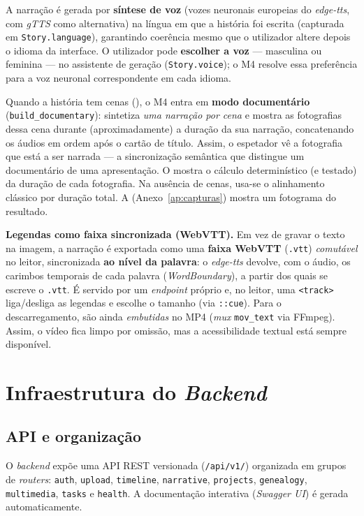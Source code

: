 A narração é gerada por \textbf{síntese de voz} (vozes neuronais
europeias do \emph{edge-tts}, com \emph{gTTS} como alternativa) na língua
em que a história foi escrita (capturada em \texttt{Story.language}),
garantindo coerência mesmo que o utilizador altere depois o idioma da
interface. O utilizador pode \textbf{escolher a voz} --- masculina ou
feminina --- no assistente de geração (\texttt{Story.voice}); o M4 resolve
essa preferência para a voz neuronal correspondente em cada idioma.

Quando a história tem cenas (), o M4 entra em \textbf{modo
documentário} (\texttt{build\_documentary}): sintetiza \emph{uma narração
por cena} e mostra as fotografias dessa cena durante (aproximadamente) a
duração da sua narração, concatenando os áudios em ordem após o cartão de
título. Assim, o espetador vê a fotografia que está a ser narrada --- a
sincronização semântica que distingue um documentário de uma apresentação.
O  mostra o cálculo determinístico (e testado) da duração
de cada fotografia. Na ausência de cenas, usa-se o alinhamento clássico por
duração total. A  (Anexo~\ref{ap:capturas}) mostra um
fotograma do resultado.



\textbf{Legendas como faixa sincronizada (WebVTT).} Em vez de gravar o
texto na imagem, a narração é exportada como uma \textbf{faixa WebVTT}
(\texttt{.vtt}) \emph{comutável} no leitor, sincronizada \textbf{ao nível
da palavra}: o \emph{edge-tts} devolve, com o áudio, os carimbos temporais
de cada palavra (\emph{WordBoundary}), a partir dos quais se escreve o
\texttt{.vtt}. É servido por um \emph{endpoint} próprio e, no leitor, uma
\texttt{<track>} liga/desliga as legendas e escolhe o tamanho (via
\texttt{::cue}). Para o descarregamento, são ainda \emph{embutidas} no MP4
(\emph{mux} \texttt{mov\_text} via FFmpeg). Assim, o vídeo fica limpo por
omissão, mas a acessibilidade textual está sempre disponível.

\section{Infraestrutura do \emph{Backend}}
\label{sec:impl_backend}

\subsection{API e organização}

O \emph{backend} expõe uma API REST versionada (\texttt{/api/v1/})
organizada em grupos de \emph{routers}: \texttt{auth}, \texttt{upload},
\texttt{timeline}, \texttt{narrative}, \texttt{projects},
\texttt{genealogy}, \texttt{multimedia}, \texttt{tasks} e \texttt{health}.
A documentação interativa (\emph{Swagger UI}) é gerada automaticamente.

